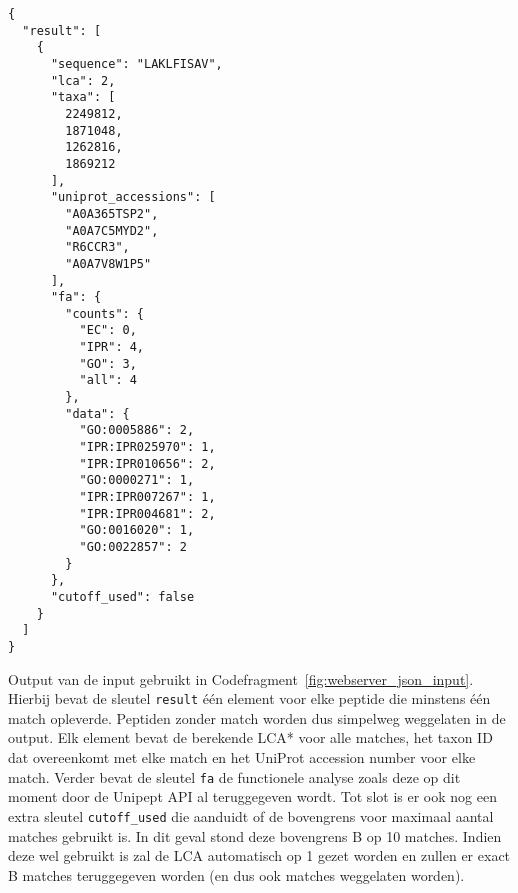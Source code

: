 \begin{listing}[h!]
    \begin{verbatim}
{
  "result": [
    {
      "sequence": "LAKLFISAV",
      "lca": 2,
      "taxa": [
        2249812,
        1871048,
        1262816,
        1869212
      ],
      "uniprot_accessions": [
        "A0A365TSP2",
        "A0A7C5MYD2",
        "R6CCR3",
        "A0A7V8W1P5"
      ],
      "fa": {
        "counts": {
          "EC": 0,
          "IPR": 4,
          "GO": 3,
          "all": 4
        },
        "data": {
          "GO:0005886": 2,
          "IPR:IPR025970": 1,
          "IPR:IPR010656": 2,
          "GO:0000271": 1,
          "IPR:IPR007267": 1,
          "IPR:IPR004681": 2,
          "GO:0016020": 1,
          "GO:0022857": 2
        }
      },
      "cutoff_used": false
    }
  ]
}
    \end{verbatim}
    \caption{Output van de input gebruikt in Codefragment~\ref{fig:webserver_json_input}.
    Hierbij bevat de sleutel \texttt{result} één element voor elke peptide die minstens één match opleverde.
    Peptiden zonder match worden dus simpelweg weggelaten in de output.
    Elk element bevat de berekende LCA* voor alle matches, het taxon ID dat overeenkomt met elke match en het UniProt accession number voor elke match.
    Verder bevat de sleutel \texttt{fa} de functionele analyse zoals deze op dit moment door de Unipept API al teruggegeven wordt.
    Tot slot is er ook nog een extra sleutel \texttt{cutoff\_used} die aanduidt of de bovengrens voor maximaal aantal matches gebruikt is.
    In dit geval stond deze bovengrens B op 10 matches.
    Indien deze wel gebruikt is zal de LCA automatisch op 1 gezet worden en zullen er exact B matches teruggegeven worden (en dus ook matches weggelaten worden).}
    \label{fig:webserver_json_output}
\end{listing}

